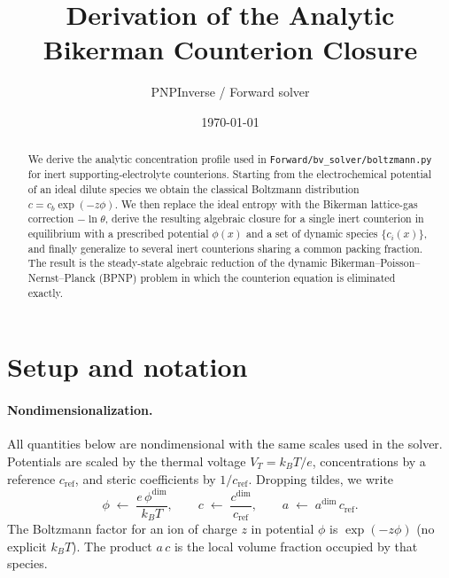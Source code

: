 \documentclass[11pt]{article}
\title{Derivation of the Analytic Bikerman Counterion Closure}
\author{PNPInverse / Forward solver}
\date{\today}
\begin{document}
\maketitle

\begin{abstract}
We derive the analytic concentration profile used in
\texttt{Forward/bv\_solver/boltzmann.py} for inert supporting-electrolyte
counterions. Starting from the electrochemical potential of an ideal
dilute species we obtain the classical Boltzmann distribution
$c = c_b \exp(-z\phi)$. We then replace the ideal entropy with the
Bikerman lattice-gas correction $-\ln\theta$, derive the resulting
algebraic closure for a single inert counterion in equilibrium with a
prescribed potential $\phi(x)$ and a set of dynamic species $\{c_i(x)\}$,
and finally generalize to several inert counterions sharing a common
packing fraction. The result is the steady-state algebraic reduction of
the dynamic Bikerman--Poisson--Nernst--Planck (BPNP) problem in which
the counterion equation is eliminated exactly.
\end{abstract}

\section{Setup and notation}

\paragraph{Nondimensionalization.}
All quantities below are nondimensional with the same scales used in the
solver. Potentials are scaled by the thermal voltage
$V_T = k_B T / e$, concentrations by a reference $c_{\mathrm{ref}}$, and
steric coefficients by $1/c_{\mathrm{ref}}$. Dropping tildes, we write
\begin{equation}
\phi \;\leftarrow\; \frac{e\,\phi^{\mathrm{dim}}}{k_B T},
\qquad
c \;\leftarrow\; \frac{c^{\mathrm{dim}}}{c_{\mathrm{ref}}},
\qquad
a \;\leftarrow\; a^{\mathrm{dim}}\, c_{\mathrm{ref}}.
\end{equation}
The Boltzmann factor for an ion of charge $z$ in potential $\phi$ is
$\exp(-z\phi)$ (no explicit $k_BT$). The product $a\,c$ is the local
volume fraction occupied by that species.
\end{document}
